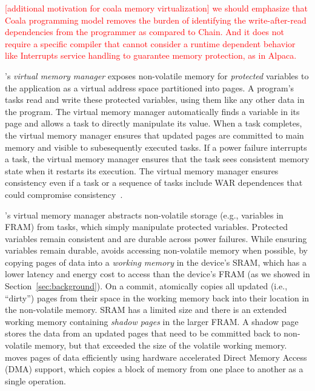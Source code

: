 \textcolor{red}{[additional motivation for coala memory virtualization] we should emphasize that Coala programming model removes the burden of identifying the write-after-read dependencies from the programmer  as compared to Chain. And it does not require a specific compiler that cannot consider a runtime dependent behavior like Interrupts service handling to guarantee memory protection, as in Alpaca.}

\sys's {\em virtual memory manager} exposes non-volatile memory for
\emph{protected} variables to the application as a virtual address space
partitioned into pages.  
%
A program's tasks read and write these protected variables, using them like any
other data in the program. 
%
The virtual memory manager automatically finds a variable in its page and  
allows a task to directly manipulate its value.
%
When a task completes, the virtual memory manager ensures that updated pages 
are committed to main memory and visible to subesequently executed tasks.
%
If a power failure interrupts a task, the virtual memory manager ensures that
the task sees consistent memory state when it restarts its execution. 
%
The virtual memory manager ensures consistency even if a task or a sequence of tasks include WAR dependences that could compromise consistency~\cite{ratchet,dino}.
%
%
%
%

\sys's virtual memory manager \sys abstracts non-volatile storage (e.g.,
variables in FRAM) from tasks, which simply manipulate protected variables.
%
Protected variables remain consistent and are durable across power failures.
%
While ensuring variables remain durable, \sys avoids accessing non-volatile
memory when possible, by copying pages of data into a {\em working memory} in the device's SRAM, which
has a lower latency and energy cost to access than the device's FRAM (as we
showed in Section~\ref{sec:background}).
%
%
On a commit, \sys atomically copies all updated (i.e., ``dirty'') pages from their
space in the working memory back into their location in the non-volatile
memory.
%
SRAM has a limited size and there is an extended working memory containing {\em
shadow pages} in the larger FRAM.  A shadow page stores the data from an
updated pages that need to be committed back to non-volatile memory, but that
exceeded the size of the volatile working memory. 
%
\sys moves pages of data efficiently using hardware accelerated Direct Memory
Access (DMA) support, which copies a block of memory from one place to another
as a single operation. 


